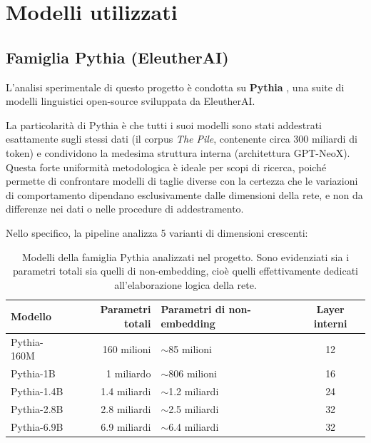 \documentclass[../relazione.tex]{subfiles}
\begin{document}
\section{Modelli utilizzati}

\subsection{Famiglia Pythia (EleutherAI)}

L'analisi sperimentale di questo progetto è condotta su \textbf{Pythia} \cite{biderman2023pythia}, una suite di modelli linguistici open-source sviluppata da EleutherAI. 

La particolarità di Pythia è che tutti i suoi modelli sono stati addestrati esattamente sugli stessi dati (il corpus \emph{The Pile}, contenente circa 300 miliardi di token) e condividono la medesima struttura interna (architettura GPT-NeoX). 
Questa forte uniformità metodologica è ideale per scopi di ricerca, poiché permette di confrontare modelli di taglie diverse con la certezza che le variazioni di comportamento dipendano esclusivamente dalle dimensioni della rete, e non da differenze nei dati o nelle procedure di addestramento.

Nello specifico, la pipeline analizza 5 varianti di dimensioni crescenti:
\begin{table}[h]
\centering
\begin{tabular}{lrlc}
\toprule
\textbf{Modello} & \textbf{Parametri totali} & \textbf{Parametri di non-embedding} & \textbf{Layer interni} \\
\midrule
Pythia-160M  & 160 milioni  & $\sim$85 milioni   & 12 \\
Pythia-1B    & 1 miliardo   & $\sim$806 milioni  & 16 \\
Pythia-1.4B  & 1.4 miliardi & $\sim$1.2 miliardi & 24 \\
Pythia-2.8B  & 2.8 miliardi & $\sim$2.5 miliardi & 32 \\
Pythia-6.9B  & 6.9 miliardi & $\sim$6.4 miliardi & 32 \\
\bottomrule
\end{tabular}
\caption{Modelli della famiglia Pythia analizzati nel progetto. Sono evidenziati sia i parametri totali sia quelli di non-embedding, cioè quelli effettivamente dedicati all'elaborazione logica della rete.}
\end{table}
\end{document}
